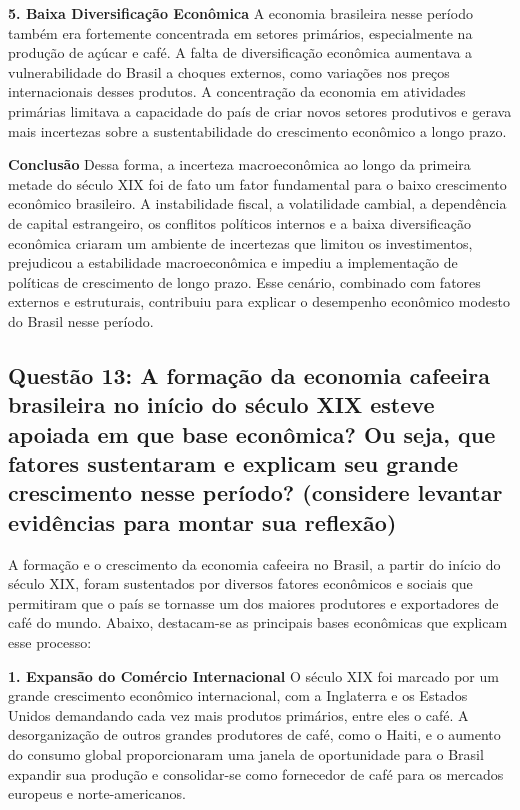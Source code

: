 \documentclass[a4paper,12pt]{article}[abntex2]
\begin{document}
\textbf{5. Baixa Diversificação Econômica}
A economia brasileira nesse período também era fortemente concentrada em setores primários, especialmente na produção de açúcar e café. A falta de diversificação econômica aumentava a vulnerabilidade do Brasil a choques externos, como variações nos preços internacionais desses produtos. A concentração da economia em atividades primárias limitava a capacidade do país de criar novos setores produtivos e gerava mais incertezas sobre a sustentabilidade do crescimento econômico a longo prazo.

\textbf{Conclusão}
Dessa forma, a incerteza macroeconômica ao longo da primeira metade do século XIX foi de fato um fator fundamental para o baixo crescimento econômico brasileiro. A instabilidade fiscal, a volatilidade cambial, a dependência de capital estrangeiro, os conflitos políticos internos e a baixa diversificação econômica criaram um ambiente de incertezas que limitou os investimentos, prejudicou a estabilidade macroeconômica e impediu a implementação de políticas de crescimento de longo prazo. Esse cenário, combinado com fatores externos e estruturais, contribuiu para explicar o desempenho econômico modesto do Brasil nesse período.

\subsection{\textbf{Questão 13: A formação da economia cafeeira brasileira no início do século XIX esteve apoiada em que base econômica? Ou seja, que fatores sustentaram e explicam seu grande crescimento nesse período? (considere levantar evidências para montar sua reflexão)}}

A formação e o crescimento da economia cafeeira no Brasil, a partir do início do século XIX, foram sustentados por diversos fatores econômicos e sociais que permitiram que o país se tornasse um dos maiores produtores e exportadores de café do mundo. Abaixo, destacam-se as principais bases econômicas que explicam esse processo:

\textbf{1. Expansão do Comércio Internacional}
O século XIX foi marcado por um grande crescimento econômico internacional, com a Inglaterra e os Estados Unidos demandando cada vez mais produtos primários, entre eles o café. A desorganização de outros grandes produtores de café, como o Haiti, e o aumento do consumo global proporcionaram uma janela de oportunidade para o Brasil expandir sua produção e consolidar-se como fornecedor de café para os mercados europeus e norte-americanos.
\end{document}
